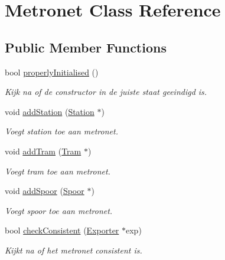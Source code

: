 \hypertarget{class_metronet}{}\section{Metronet Class Reference}
\label{class_metronet}
\subsection*{Public Member Functions}
\begin{DoxyCompactItemize}
\item 
\mbox{\label{class_metronet_a3d2adce29a947f162924279b766de645}} 
bool \hyperlink{class_metronet_a3d2adce29a947f162924279b766de645}{properly\+Initialised} ()
\begin{DoxyCompactList}\small\item\em Kijk na of de constructor in de juiste staat geeindigd is. \end{DoxyCompactList}\item 
void \hyperlink{class_metronet_a37106294bf52324b0fb9fcecf11e5495}{add\+Station} (\hyperlink{class_station}{Station} $\ast$)
\begin{DoxyCompactList}\small\item\em Voegt station toe aan metronet. \end{DoxyCompactList}\item 
void \hyperlink{class_metronet_ab9bcc898b7b0ec5571ce149364cf64fc}{add\+Tram} (\hyperlink{class_tram}{Tram} $\ast$)
\begin{DoxyCompactList}\small\item\em Voegt tram toe aan metronet. \end{DoxyCompactList}\item 
void \hyperlink{class_metronet_ab6faa9e35828352e4003640d13798529}{add\+Spoor} (\hyperlink{class_spoor}{Spoor} $\ast$)
\begin{DoxyCompactList}\small\item\em Voegt spoor toe aan metronet. \end{DoxyCompactList}\item 
bool \hyperlink{class_metronet_a0128de167ec0a36e70abd57170b3faed}{check\+Consistent} (\hyperlink{class_exporter}{Exporter} $\ast$exp)
\begin{DoxyCompactList}\small\item\em Kijkt na of het metronet consistent is. \end{DoxyCompactList}\end{DoxyCompactItemize}


